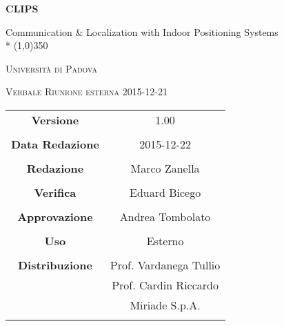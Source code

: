\documentclass[a4paper,12pt]{article}
\author{Marco Zanella}
\date{22/12/2015}
\begin{document}
\begin{titlepage}
	\centering
	{\huge\bfseries CLIPS\par}
	Communication \& Localization with Indoor Positioning Systems \\*
	\line(1,0){350} \\
	{\scshape\LARGE Università di Padova \par}
	\vspace{1cm}
	{\scshape\Large Verbale Riunione esterna 2015-12-21 \par}
	\logo
	\newpage
	\begin{tabular}{c|c}
		{\hfill\textbf{Versione}} 			& 1.00				\\ \\
		{\hfill\textbf{Data Redazione}} 	& 2015-12-22	  		\\ \\
		{\hfill\textbf{Redazione}} 			& Marco Zanella		\\ \\
		{\hfill\textbf{Verifica}} 			& Eduard Bicego		\\ \\
		{\hfill\textbf{Approvazione}} 		& Andrea Tombolato	\\ \\
		{\hfill\textbf{Uso}} 				& Esterno	\\ \\
		{\hfill\textbf{Distribuzione}} 		& Prof. Vardanega Tullio \\
											& Prof. Cardin Riccardo \\
											& Miriade S.p.A. \\ \\
	\end{tabular}
\end{titlepage}
	
	\newpage

	
	\label{LastFrontPage}
	

	\newpage
	
	\pagestyle{mymain}
	
	
		

	
		
	
	
		
	
	
		
				
	\label{LastPage}
\end{document}
